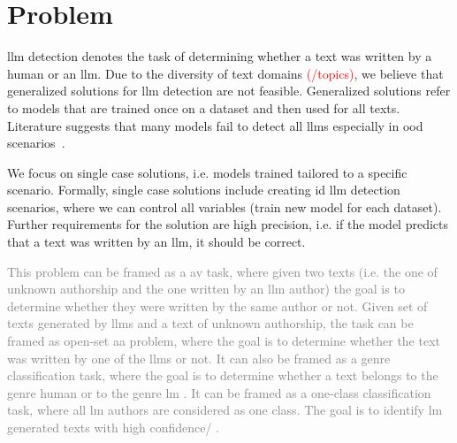 \section{Problem}
\label{sec:problem}

\ac{llm} detection denotes the task of determining whether a text was written by a human or an \ac{llm}.
Due to the diversity of text domains \textcolor{red}{(/topics)}, we believe that generalized solutions for \ac{llm} detection are not feasible.
Generalized solutions refer to models that are trained once on a dataset and then used for all texts.
Literature suggests that many models fail to detect all \acp{llm} especially in \ac{ood} scenarios~\citep{bhattacharjee_fighting_2024,li_learning_2025}.

We focus on single case solutions, i.e. models trained tailored to a specific scenario.
Formally, single case solutions include creating \ac{id} \ac{llm} detection scenarios, 
where we can control all variables (train new model for each dataset).
Further requirements for the solution are high precision, i.e. if the model predicts that a text was written by an \ac{llm}, it should be correct.

\textcolor{gray}{
This problem can be framed as a \ac{av} task, where given two texts 
(i.e. the one of unknown authorship and the one written by an \ac{llm} author) 
the goal is to determine whether they were written by the same author or not.
Given set of texts generated by \acp{llm} and a text of unknown authorship,
the task can be framed as open-set \ac{aa} problem, 
where the goal is to determine whether the text was written by one of the \acp{llm} or not.
It can also be framed as a genre classification task, where the goal is to determine whether a text belongs 
to the genre human or to the genre \ac{lm} .
It can be framed as a one-class classification task, where all \ac{lm} authors are considered as one class.
The goal is to identify \ac{lm} generated texts with high confidence/ .
}

